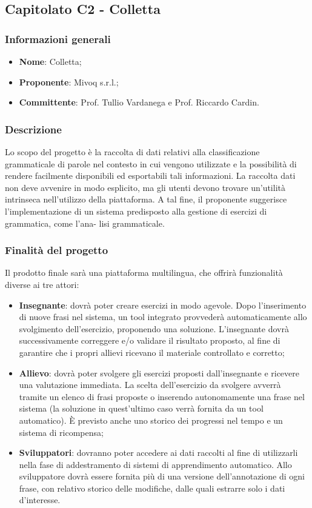 \subsection{Capitolato C2 - Colletta}
\subsubsection{Informazioni generali}
\begin{itemize}
	\item \textbf{Nome}: Colletta;
	\item \textbf{Proponente}: Mivoq s.r.l.;
	\item \textbf{Committente}: Prof. Tullio Vardanega e Prof. Riccardo Cardin.
\end{itemize}

\subsubsection{Descrizione}
Lo scopo del progetto è la raccolta di dati relativi alla classificazione grammaticale di parole nel
contesto in cui vengono utilizzate e la possibilità di rendere facilmente disponibili ed esportabili
tali informazioni. La raccolta dati non deve avvenire in modo esplicito, ma gli utenti devono
trovare un’utilità intrinseca nell’utilizzo della piattaforma. A tal fine, il proponente suggerisce
l’implementazione di un sistema predisposto alla gestione di esercizi di grammatica, come l’ana-
lisi grammaticale. 

 
\subsubsection{Finalità del progetto}
Il prodotto finale sarà una piattaforma multilingua, che offrirà funzionalità diverse ai tre attori:

\begin{itemize}
	\item \textbf{Insegnante}: dovrà poter creare esercizi in modo agevole. Dopo l'inserimento di nuove frasi
	 nel sistema, un tool integrato provvederà automaticamente allo svolgimento
	 dell'esercizio, proponendo una soluzione. L'insegnante dovrà 
	 successivamente correggere e/o validare il risultato proposto, al fine di
	 garantire che i propri allievi ricevano il materiale controllato e corretto;
	\item \textbf{Allievo}:
	dovrà poter svolgere gli esercizi proposti
	dall'insegnante e ricevere una valutazione immediata. La scelta
	dell'esercizio da svolgere avverrà tramite un elenco di frasi proposte o
	inserendo autonomamente una frase nel sistema (la soluzione in quest'ultimo caso verrà fornita da un tool automatico). \`E previsto
    anche uno storico dei progressi nel tempo e un sistema di ricompensa;
	\item \textbf{Sviluppatori}:
	dovranno poter accedere ai dati
	raccolti al fine di utilizzarli nella fase di addestramento di sistemi di apprendimento automatico. Allo sviluppatore dovrà essere fornita più di una versione dell'annotazione di ogni frase, con relativo storico delle modifiche, dalle quali estrarre solo i dati d'interesse.
\end{itemize}

